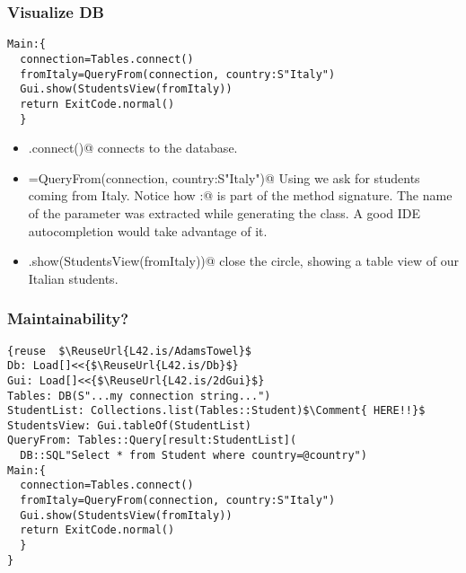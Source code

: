 \begin{frame}[fragile]
\frametitle{Visualize DB}
\begin{NiceCode}{59ex}{1}
\begin{lstlisting}
Main:{
  connection=Tables.connect()
  fromItaly=QueryFrom(connection, country:S"Italy")
  Gui.show(StudentsView(fromItaly))
  return ExitCode.normal()
  }
\end{lstlisting}
\end{NiceCode}
\begin{itemize}
\item \Q@Tables.connect()@ connects to the database.
\item\Q@fromItaly=QueryFrom(connection, country:S"Italy")@
Using \Q@QueryForm@ we ask for students coming from Italy.
Notice how \Q@country:@ is part of the method signature.
The name of the parameter was extracted while generating the class.
A good IDE autocompletion would take advantage of it.
\item\Q@Gui.show(StudentsView(fromItaly))@
close the circle, showing a table view of our Italian students.

\end{itemize}
\end{frame}


\begin{frame}[fragile]
\frametitle{Maintainability?}
\begin{NiceCode}{59ex}{1}
\begin{lstlisting}
{reuse  $\ReuseUrl{L42.is/AdamsTowel}$
Db: Load[]<<{$\ReuseUrl{L42.is/Db}$}
Gui: Load[]<<{$\ReuseUrl{L42.is/2dGui}$}
Tables: DB(S"...my connection string...")
StudentList: Collections.list(Tables::Student)$\Comment{ HERE!!}$
StudentsView: Gui.tableOf(StudentList)
QueryFrom: Tables::Query[result:StudentList](
  DB::SQL"Select * from Student where country=@country")
Main:{
  connection=Tables.connect()
  fromItaly=QueryFrom(connection, country:S"Italy")
  Gui.show(StudentsView(fromItaly))
  return ExitCode.normal()
  }
}
\end{lstlisting}
\end{NiceCode}
\end{frame}
